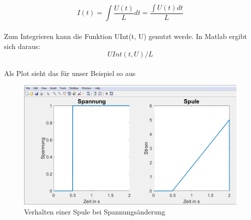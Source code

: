 \documentclass[%
  a4paper, %
  12pt, %
   article, %
  titlepage
]{scrartcl}
\begin{document}
\begin{equation}
I(t) = \int \frac{U(t)}{L} dt = \frac{\int U(t) dt}{L}
\end{equation}
\\
Zum Integrieren kann die Funktion UInt(t, U) genutzt werde.
In Matlab ergibt sich daraus:
\begin{equation}
UInt(t, U)  /  L
\end{equation}
\\
Als Plot sieht das für unser Beispiel so aus


\begin{figure}[h]
\includegraphics[width=\textwidth]{plot4.png}
\caption{Verhalten einer Spule bei Spannungsänderung}
\label{fig5}
\end{figure}
\end{document}
